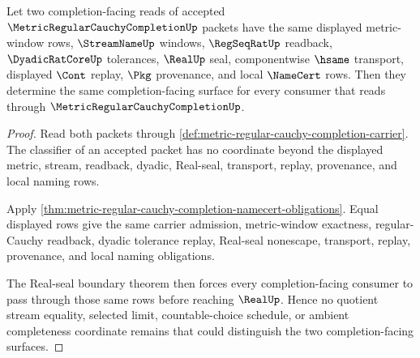 \begin{theorem}
\label{thm:metric-regular-cauchy-completion-window-universality}
Let two completion-facing reads of accepted $\MetricRegularCauchyCompletionUp$ packets have the same displayed metric-window rows, $\StreamNameUp$ windows, $\RegSeqRatUp$ readback, $\DyadicRatCoreUp$ tolerances, $\RealUp$ seal, componentwise $\hsame$ transport, displayed $\Cont$ replay, $\Pkg$ provenance, and local $\NameCert$ rows. Then they determine the same completion-facing surface for every consumer that reads through $\MetricRegularCauchyCompletionUp$.
\end{theorem}
\begin{proof}
Read both packets through \autoref{def:metric-regular-cauchy-completion-carrier}. The classifier of an accepted packet has no coordinate beyond the displayed metric, stream, readback, dyadic, Real-seal, transport, replay, provenance, and local naming rows.

Apply \autoref{thm:metric-regular-cauchy-completion-namecert-obligations}. Equal displayed rows give the same carrier admission, metric-window exactness, regular-Cauchy readback, dyadic tolerance replay, Real-seal nonescape, transport, replay, provenance, and local naming obligations.

The Real-seal boundary theorem then forces every completion-facing consumer to pass through those same rows before reaching $\RealUp$. Hence no quotient stream equality, selected limit, countable-choice schedule, or ambient completeness coordinate remains that could distinguish the two completion-facing surfaces.
\end{proof}




